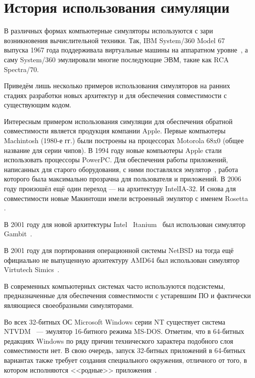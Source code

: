 \section{История использования симуляции}

В различных формах компьютерные симуляторы используются с зари возникновения вычислительной техники. Так, IBM System/360 Model 67 выпуска 1967 года поддерживала виртуальные машины на аппаратном уровне~\cite{ibm360vm}, а саму System/360 эмулировали многие последующие ЭВМ, такие как RCA Spectra/70.

Приведём лишь несколько примеров использования симуляторов на ранних стадиях разработки новых архитектур и для обеспечения совместимости с существующим кодом.

\begin{itemize*}

\item Интересным примером использования симуляции для обеспечения обратной совместимости является продукция компании Apple.  Первые компьютеры Machintosh (1980-е гг.) были построены на процессорах Motorola 68x0 (общее название для серии чипов). В 1994 году новые компьютеры Apple стали использовать процессоры PowerPC. Для обеспечения работы приложений, написанных для старого оборудования, с ними поставлялся эмулятор~\cite{apple-ppcsoftware}, работа которого была максимально прозрачна для пользователя и приложений. В 2006 году произошёл ещё один переход --- на архитектуру Intel\textregistered IA-32. И снова для совместимости новые Макинтоши имели встроенный эмулятор с именем Rosetta \cite{apple-rosetta, macosx-internals}.

\item В 2001 году для новой архитектуры Intel\textregistered~ Itanium\texttrademark~ был использован симулятор Gambit~\cite{carole2001}.

\item В 2001 году для портирования операционной системы NetBSD на тогда ещё официально не выпущенную архитектуру AMD64 был использован симулятор Virtutech Simics~\cite{netbsd-amd64}.

\item В современных компьютерных системах часто используются подсистемы, предназначенные для обеспечения совместимости с устаревшим ПО и фактически являющиеся своеобразными симуляторами.

\item Во всех 32-битных ОС Microsoft Windows серии NT существует система NTVDM~\cite{ntvdm} --- эмулятор 16-битного режима MS-DOS. Отметим, что в 64-битных редакциях Windows по ряду причин технического характера подобного слоя совместимости нет. В свою очередь, запуск 32-битных приложений в 64-битных вариантах также требует создания специального окружения, отличного от того, в котором исполняются <<родные>> приложения~\cite[глава 3]{wininternals6-pt1}.


\end{itemize*}
